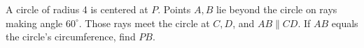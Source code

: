 A circle of radius 4 is centered at $ P $. Points $ A,B $ lie beyond the circle on rays making angle $ 60^\circ $. Those rays meet the circle at $ C,D $, and $ AB\parallel CD $. If $ AB $ equals the circle's circumference, find $ PB $.

